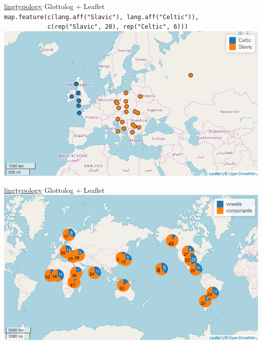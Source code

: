\documentclass[13pt, t]{beamer}
\begin{document}
\begin{frame}{\href{https://ropensci.github.io/lingtypology/}{lingtypology}}
\alert{\large Glottolog + Leaflet}\\
\vfill
\texttt{\small  map.feature(c(lang.aff("Slavic"), lang.aff("Celtic")),}\\
\texttt{\small \ \ \ \ \ \ \ \ \ \ \ \ c(rep("Slavic"{}, 20), rep("Celtic"{}, 6)))}\\
\includegraphics[width=\linewidth]{images/03-colored}
\end{frame}

\begin{frame}{\href{https://ropensci.github.io/lingtypology/}{lingtypology}}
\alert{\large Glottolog + Leaflet}\\
\vfill
\includegraphics[width=\linewidth]{images/04-minicharts}
\end{frame}
\end{document}
